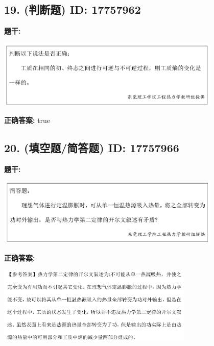 \documentclass[12pt]{article}
\begin{document}
\vspace{0.5em}\hrulefill\vspace{1em}

\subsection*{19. (判断题) \small ID: 17757962}

\textbf{题干:}


\begin{center}\includegraphics[width=0.8\textwidth, height=0.25\textheight, keepaspectratio]{question_19_17757962/title_img_1.png}\end{center}

\textbf{正确答案:}
true

\vspace{0.5em}\hrulefill\vspace{1em}

\subsection*{20. (填空题/简答题) \small ID: 17757966}

\textbf{题干:}


\begin{center}\includegraphics[width=0.8\textwidth, height=0.25\textheight, keepaspectratio]{question_20_17757966/title_img_1.png}\end{center}

\textbf{正确答案:}

\begin{center}\includegraphics[width=0.7\textwidth, height=0.2\textheight, keepaspectratio]{question_20_17757966/correct_answer_1_img_1.png}\end{center}
\end{document}
